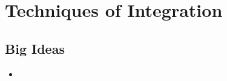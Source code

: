 \chapter{Techniques of Integration}
\label{chap:TI}

\section{Big Ideas}
\label{sec:TI Big Ideas}
\begin{itemize}
  \item 
\end{itemize}